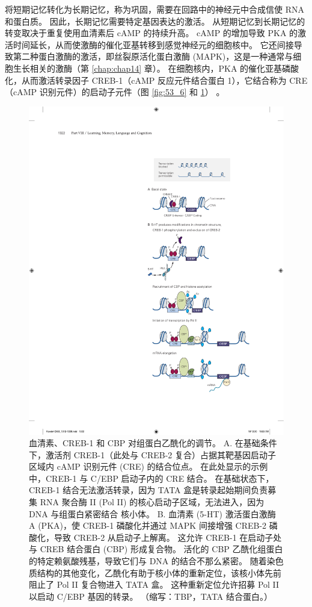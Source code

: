 将短期记忆转化为长期记忆，称为巩固，需要在回路中的神经元中合成信使 RNA 和蛋白质。
因此，长期记忆需要特定基因表达的激活。
从短期记忆到长期记忆的转变取决于重复使用血清素后 cAMP 的持续升高。
cAMP 的增加导致 PKA 的激活时间延长，从而使激酶的催化亚基转移到感觉神经元的细胞核中。
它还间接导致第二种蛋白激酶的激活，即丝裂原活化蛋白激酶 (MAPK)，这是一种通常与细胞生长相关的激酶（第 \ref{chap:chap14} 章）。
在细胞核内，PKA 的催化亚基磷酸化，从而激活转录因子 CREB-1（cAMP 反应元件结合蛋白 1），它结合称为 CRE（cAMP 识别元件）的启动子元件（图 \ref{fig:53_6} 和 \ref{fig:53_7}） 。


\begin{figure}[htbp]
	\centering
	\includegraphics[width=0.6\linewidth]{chap53/fig_53_7}
	\caption{血清素、CREB-1 和 CBP 对组蛋白乙酰化的调节。 A. 在基础条件下，激活剂 CREB-1（此处与 CREB-2 复合）占据其靶基因启动子区域内 cAMP 识别元件 (CRE) 的结合位点。 在此处显示的示例中，CREB-1 与 C/EBP 启动子内的 CRE 结合。 在基础状态下，CREB-1 结合无法激活转录，因为 TATA 盒是转录起始期间负责募集 RNA 聚合酶 II (Pol II) 的核心启动子区域，无法进入，因为 DNA 与组蛋白紧密结合 核小体。 B. 血清素 (5-HT) 激活蛋白激酶 A (PKA)，使 CREB-1 磷酸化并通过 MAPK 间接增强 CREB-2 磷酸化，导致 CREB-2 从启动子上解离。 这允许 CREB-1 在启动子处与 CREB 结合蛋白 (CBP) 形成复合物。 活化的 CBP 乙酰化组蛋白的特定赖氨酸残基，导致它们与 DNA 的结合不那么紧密。 随着染色质结构的其他变化，乙酰化有助于核小体的重新定位，该核小体先前阻止了 Pol II 复合物进入 TATA 盒。 这种重新定位允许招募 Pol II 以启动 C/EBP 基因的转录。 （缩写：TBP，TATA 结合蛋白。）}
	\label{fig:53_7}
\end{figure}


